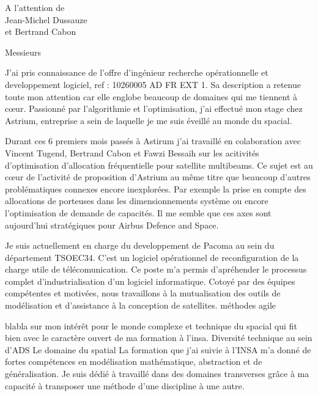 \documentclass[12pt]{lettre}
\begin{document}
\begin{letter}{A l'attention de\\Jean-Michel Dussauze\\et Bertrand Cabon}
\address{Victor Cameo Ponz\\16 rue Payras\\31000 Toulouse}
\nofax

\opening{Messieurs}
{%
J'ai pris connaissance de l'offre d'ingénieur recherche opérationnelle et
developpement logiciel, ref : 10260005 AD FR EXT 1.
Sa description a retenue toute mon attention car elle englobe beaucoup de
domaines qui me tiennent à c\oe{}ur.
Passionné par l'algorithmie et l'optimisation, j'ai effectué mon stage
chez Astrium, entreprise a sein de laquelle je me suis éveillé au monde du spacial.
}

{%
Durant ces 6 premiers mois passés à Astirum j'ai travaillé en colaboration
avec Vincent Tugend, Bertrand Cabon et Fawzi Bessaih sur les acitivités
d'optimisation d'allocation fréquentielle pour satellite multibeams.
Ce sujet est au cœur de l'activité de proposition d'Astrium
au même titre que beaucoup d'autres problématiques connexes encore inexplorées.
Par exemple la prise en compte des allocations de porteuses dans les
dimensionnements système ou encore l'optimisation de demande de capacités.
Il me semble que ces axes sont aujourd'hui stratégiques pour Airbus Defence and Space.
}

{%
Je suis actuellement en charge du developpement de Pacoma au sein
du département TSOEC34.
C'est un logiciel opérationnel de reconfiguration de la charge utile de
télécomunication.
Ce poste m'a permis d'apréhender le processus complet d'industrialisation d'un
logiciel informatique.
Cotoyé par des équipes compétentes et motivées, nous travaillons à la
mutualisation des outils de modélisation et d'assistance à la conception de
satellites.
méthodes agile
}

{%
blabla sur mon intérêt pour le monde complexe et technique du spacial qui fit
bien avec le caractère ouvert de ma formation à l'insa.
Diversité technique au sein d'ADS
Le domaine du spatial
La formation que j'ai suivie à l'INSA m'a donné de fortes compétences en
modélisation mathématique, abstraction et de généralisation.
Je suis dédié à travaillé dans des domaines transverses grâce à ma
capacité à transposer une méthode d'une discipline à une autre.
}


\end{letter}
\end{document}
